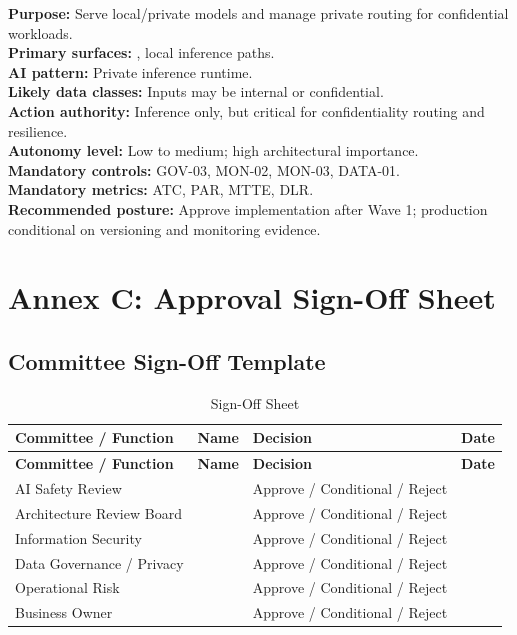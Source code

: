 \documentclass[11pt,a4paper]{article}
\begin{document}
\textbf{Purpose:} Serve local/private models and manage private routing for confidential workloads.\\
\textbf{Primary surfaces:} , local inference paths.\\
\textbf{AI pattern:} Private inference runtime.\\
\textbf{Likely data classes:} Inputs may be internal or confidential.\\
\textbf{Action authority:} Inference only, but critical for confidentiality routing and resilience.\\
\textbf{Autonomy level:} Low to medium; high architectural importance.\\
\textbf{Mandatory controls:} GOV-03, MON-02, MON-03, DATA-01.\\
\textbf{Mandatory metrics:} ATC, PAR, MTTE, DLR.\\
\textbf{Recommended posture:} Approve implementation after Wave 1; production conditional on versioning and monitoring evidence.

\section{Annex C: Approval Sign-Off Sheet}

\subsection{Committee Sign-Off Template}

\begin{longtable}{P{0.28\textwidth}P{0.22\textwidth}P{0.18\textwidth}P{0.18\textwidth}}
\caption{Sign-Off Sheet} \\
\toprule
\textbf{Committee / Function} & \textbf{Name} & \textbf{Decision} & \textbf{Date} \\
\midrule
\endfirsthead
\toprule
\textbf{Committee / Function} & \textbf{Name} & \textbf{Decision} & \textbf{Date} \\
\midrule
\endhead
AI Safety Review & & Approve / Conditional / Reject & \\
Architecture Review Board & & Approve / Conditional / Reject & \\
Information Security & & Approve / Conditional / Reject & \\
Data Governance / Privacy & & Approve / Conditional / Reject & \\
Operational Risk & & Approve / Conditional / Reject & \\
Business Owner & & Approve / Conditional / Reject & \\
\bottomrule
\end{longtable}
\end{document}
